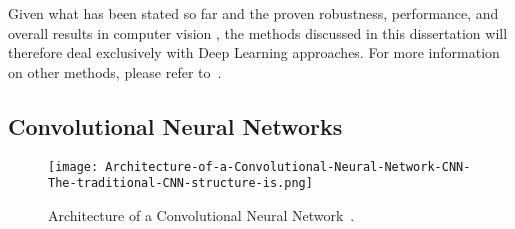\documentclass[class=report, crop=false, a4paper, 12pt]{standalone}
\begin{document}
\par Given what has been stated so far and the proven robustness, performance, and overall results in computer vision , the methods discussed in this dissertation will therefore deal exclusively with Deep Learning approaches. For more information on other methods, please refer to~\autocite{learned-millerLabeledFacesWild2016}.




\subsection{Convolutional Neural Networks}
\begin{figure}[!h]
    \centering
    \texttt{[image: Architecture-of-a-Convolutional-Neural-Network-CNN-The-traditional-CNN-structure-is.png]}
    \caption{Architecture of a Convolutional Neural Network~\autocite{kangDeepSimilarityMetric2019}.}
    \label{fig:cnn}
\end{figure}
\end{document}
